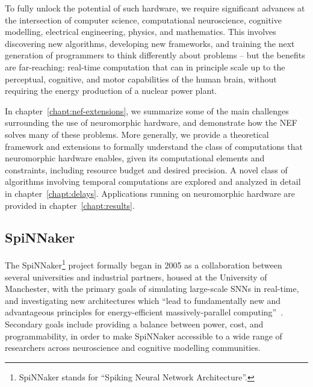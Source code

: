 To fully unlock the potential of such hardware, we require significant advances at the intersection of computer science, computational neuroscience, cognitive modelling, electrical engineering, physics, and mathematics.
This involves discovering new algorithms, developing new frameworks, and training the next generation of programmers to think differently about problems -- but the benefits are far-reaching: real-time computation that can in principle scale up to the perceptual, cognitive, and motor capabilities of the human brain, without requiring the energy production of a nuclear power plant.

In chapter~\ref{chapt:nef-extensions}, we summarize some of the main challenges surrounding the use of neuromorphic hardware, and demonstrate how the NEF solves many of these problems.
More generally, we provide a theoretical framework and extensions to formally understand the class of computations that neuromorphic hardware enables, given its computational elements and constraints, including resource budget and desired precision.
A novel class of algorithms involving temporal computations are explored and analyzed in detail in chapter~\ref{chapt:delays}.
Applications running on neuromorphic hardware are provided in chapter~\ref{chapt:results}.

\subsection{SpiNNaker}

The SpiNNaker\footnote{SpiNNaker stands for ``Spiking Neural Network Architecture''.} project formally began in 2005 as a collaboration between several universities and industrial partners, housed at the University of Manchester, with the primary goals of simulating large-scale SNNs in real-time, and investigating new architectures which ``lead to fundamentally new and advantageous principles for energy-efficient massively-parallel computing''~\citep{spinnakerproject, furber2014spinnaker}.
Secondary goals include providing a balance between power, cost, and programmability, in order to make SpiNNaker accessible to a wide range of researchers across neuroscience and cognitive modelling communities.

